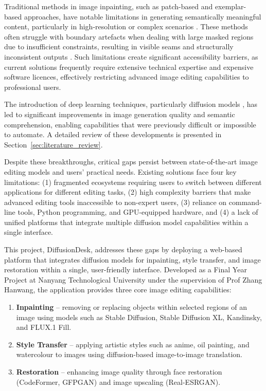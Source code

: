 \documentclass[12pt,a4paper]{report}
\begin{document}
Traditional methods in image inpainting, such as patch-based and exemplar-based approaches, have notable limitations in generating semantically meaningful content, particularly in high-resolution or complex scenarios \citep{ma2023uncertainty}. These methods often struggle with boundary artefacts when dealing with large masked regions due to insufficient constraints, resulting in visible seams and structurally inconsistent outputs \citep{ma2023uncertainty}. Such limitations create significant accessibility barriers, as current solutions frequently require extensive technical expertise and expensive software licences, effectively restricting advanced image editing capabilities to professional users.

The introduction of deep learning techniques, particularly diffusion models \citep{ho2020ddpm, song2021ddim, rombach2022ldm}, has led to significant improvements in image generation quality and semantic comprehension, enabling capabilities that were previously difficult or impossible to automate. A detailed review of these developments is presented in Section~\ref{sec:literature_review}.

Despite these breakthroughs, critical gaps persist between state-of-the-art image editing models and users' practical needs. Existing solutions face four key limitations: (1) fragmented ecosystems requiring users to switch between different applications for different editing tasks, (2) high complexity barriers that make advanced editing tools inaccessible to non-expert users, (3) reliance on command-line tools, Python programming, and GPU-equipped hardware, and (4) a lack of unified platforms that integrate multiple diffusion model capabilities within a single interface.

This project, DiffusionDesk, addresses these gaps by deploying a web-based platform that integrates diffusion models for inpainting, style transfer, and image restoration within a single, user-friendly interface. Developed as a Final Year Project at Nanyang Technological University under the supervision of Prof Zhang Hanwang, the application provides three core image editing capabilities:

\begin{enumerate}
    \item \textbf{Inpainting} -- removing or replacing objects within selected regions of an image using models such as Stable Diffusion, Stable Diffusion XL, Kandinsky, and FLUX.1 Fill.
    \item \textbf{Style Transfer} -- applying artistic styles such as anime, oil painting, and watercolour to images using diffusion-based image-to-image translation.
    \item \textbf{Restoration} -- enhancing image quality through face restoration (CodeFormer, GFPGAN) and image upscaling (Real-ESRGAN).
\end{enumerate}
\end{document}
